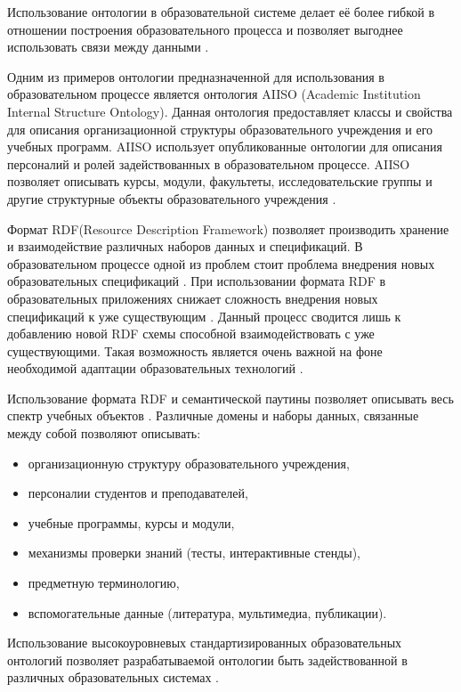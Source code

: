 Использование онтологии в образовательной системе делает её более гибкой в отношении построения образовательного процесса и позволяет выгоднее использовать связи между данными \cite{wilson2004role}.

Одним из примеров онтологии предназначенной для использования в образовательном процессе является онтология AIISO (Academic Institution Internal Structure Ontology). Данная онтология предоставляет классы и свойства для описания организационной структуры образовательного учреждения и его учебных программ. AIISO использует опубликованные онтологии для описания персоналий и ролей задействованных в образовательном процессе. AIISO позволяет описывать курсы, модули, факультеты, исследовательские группы и другие структурные объекты образовательного учреждения \cite{styles2008academic}. 

Формат RDF(Resource Description Framework) позволяет производить хранение и взаимодействие различных наборов данных и спецификаций. В образовательном процессе одной из проблем стоит проблема внедрения новых образовательных спецификаций \cite{henze2004reasoning}. При использовании формата RDF в образовательных приложениях снижает сложность внедрения новых спецификаций к уже существующим \cite{moller2010learning}. Данный процесс сводится лишь к добавлению новой RDF схемы способной взаимодействовать с уже существующими. Такая возможность является очень важной на фоне необходимой адаптации образовательных технологий \cite{nilsson2001semantic}. 

Использование формата RDF и семантической паутины позволяет описывать весь спектр учебных объектов \cite{bouzeghoub2004rdf}. Различные домены и наборы данных, связанные между собой позволяют описывать:

\begin{itemize}
\item организационную структуру образовательного учреждения,
\item персоналии студентов и преподавателей,
\item учебные программы, курсы и модули,
\item механизмы проверки знаний (тесты, интерактивные стенды),
\item предметную терминологию,
\item вспомогательные данные (литература, мультимедиа, публикации).
\end{itemize}

Использование высокоуровневых стандартизированных образовательных онтологий позволяет разрабатываемой онтологии быть задействованной в различных образовательных системах \cite{bansal2012role}. 

